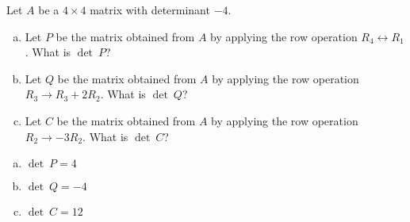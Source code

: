 
\begin{exerciseStatement}


Let \(A\) be a \(4 \times 4\) matrix with determinant \( -4 \).


\begin{enumerate}[(a)]
\item Let \(P\) be the matrix obtained from \(A\) by applying the row operation \( R_4 \leftrightarrow R_1 \). What is \(\operatorname{det}\ P\)?
\item Let \(Q\) be the matrix obtained from \(A\) by applying the row operation \( R_3 \to R_3 + 2R_2 \). What is \(\operatorname{det}\ Q\)?
\item Let \(C\) be the matrix obtained from \(A\) by applying the row operation \( R_2 \to -3R_2 \). What is \(\operatorname{det}\ C\)?
\end{enumerate}
    
\end{exerciseStatement}
    
\begin{exerciseAnswer} 

\begin{enumerate}[(a)]
\item \(\operatorname{det}\ P= 4 \)
\item \(\operatorname{det}\ Q= -4 \)
\item \(\operatorname{det}\ C= 12 \)
\end{enumerate}
    
\end{exerciseAnswer}
    
